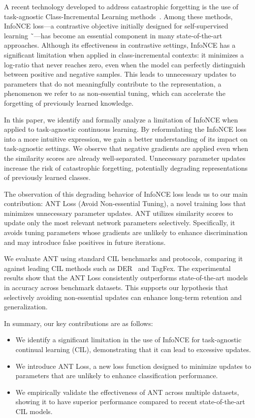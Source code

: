 \documentclass[letterpaper]{article} %
\begin{document}
A recent technology developed to address catastrophic forgetting is the use of task-agnostic Class-Incremental Learning methods~\cite{zheng2025task}. Among these methods, InfoNCE loss—a contrastive objective initially designed for self-supervised learning ˜\cite{han2020self,li2021self,jing2023contrastive}—has become an essential component in many state-of-the-art approaches. Although its effectiveness in contrastive settings, InfoNCE has a significant limitation when applied in class-incremental contexts: it minimizes a log-ratio that never reaches zero, even when the model can perfectly distinguish between positive and negative samples. This leads to unnecessary updates to parameters that do not meaningfully contribute to the representation, a phenomenon we refer to as non-essential tuning, which can accelerate the forgetting of previously learned knowledge.

In this paper, we identify and formally analyze a limitation of InfoNCE when applied to task-agnostic continuous learning. By reformulating the InfoNCE loss into a more intuitive expression, we gain a better understanding of its impact on task-agnostic settings. We observe that negative gradients are applied even when the similarity scores are already well-separated. Unnecessary parameter updates increase the risk of catastrophic forgetting, potentially degrading representations of previously learned classes.

The observation of this degrading behavior of InfoNCE loss leads us to our main contribution: ANT Loss (Avoid Non-essential Tuning), a novel training loss that minimizes unnecessary parameter updates. ANT utilizes similarity scores to update only the most relevant network parameters selectively. Specifically, it avoids tuning parameters whose gradients are unlikely to enhance discrimination and may introduce false positives in future iterations.

We evaluate ANT using standard CIL benchmarks and protocols, comparing it against leading CIL methods such as DER~\cite{yan2021dynamically} and TagFex\cite{zheng2025task}. The experimental results show that the ANT Loss consistently outperforms state-of-the-art models in accuracy across benchmark datasets. This supports our hypothesis that selectively avoiding non-essential updates can enhance long-term retention and generalization.

In summary, our key contributions are as follows:
\begin{itemize}
\item We identify a significant limitation in the use of InfoNCE for task-agnostic continual learning (CIL), demonstrating that it can lead to excessive updates.
\item We introduce ANT Loss, a new loss function designed to minimize updates to parameters that are unlikely to enhance classification performance.
\item We empirically validate the effectiveness of ANT across multiple datasets, showing it to have superior performance compared to recent state-of-the-art CIL models.
\end{itemize}
\end{document}
